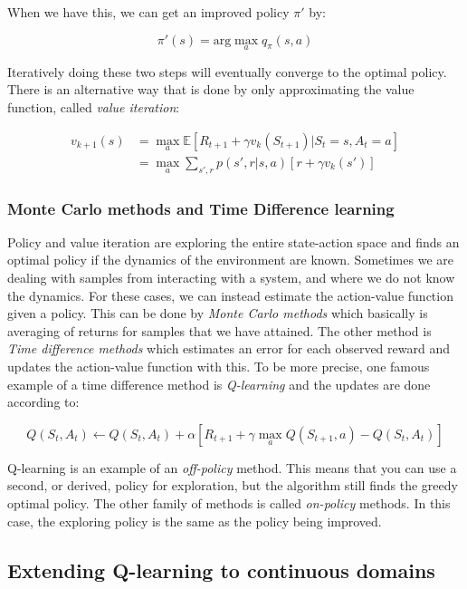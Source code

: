When we have this, we can get an improved policy $\pi'$ by:

\begin{equation}
    \pi'(s) = \text{arg}\max_a q_\pi(s, a)
\end{equation}

Iteratively doing these two steps will eventually converge to the optimal
policy. There is an alternative way that is done by only approximating the
value function, called \textit{value iteration}:

\begin{align*}
    v_{k+1}(s) &= \max_a \mathbb{E}\left[R_{t+1} + \gamma v_k(S_{t+1}) | S_t=s, A_t = a \right] \\
             &= \max_a \sum_{s', r} p(s', r|s, a) \left[r + \gamma v_k(s')\right]
\end{align*}

\subsubsection{Monte Carlo methods and Time Difference learning}

Policy and value iteration are exploring the entire state-action space and
finds an optimal policy if the dynamics of the environment are known. Sometimes
we are dealing with samples from interacting with a system, and where we do not
know the dynamics. For these cases, we can instead estimate the action-value
function given a policy. This can be done by \textit{Monte Carlo methods} which
basically is averaging of returns for samples that we have attained. The other
method is \textit{Time difference methods} which estimates an error for each
observed reward and updates the action-value function with this. To be more
precise, one famous example of a time difference method is \textit{Q-learning}
and the updates are done according to:

\begin{equation}
    Q(S_t, A_t) \leftarrow Q(S_t, A_t) + \alpha \left[ R_{t+1} + \gamma \max_a Q(S_{t+1}, a) - Q(S_t, A_t) \right]
\end{equation}

Q-learning is an example of an \textit{off-policy} method. This means that you
can use a second, or derived, policy for exploration, but the algorithm still
finds the greedy optimal policy. The other family of methods is called
\textit{on-policy} methods. In this case, the exploring policy is the
same as the policy being improved.

\subsection{Extending Q-learning to continuous domains}

